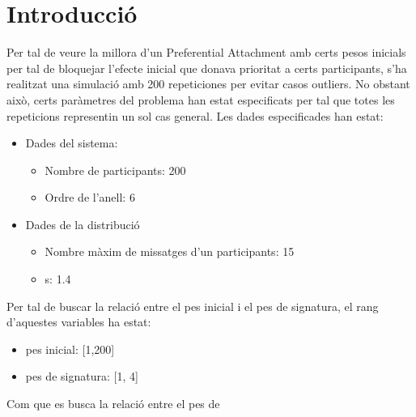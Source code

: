 \documentclass{article}
\begin{document}
\section{Introducció}
Per tal de veure la millora d'un Preferential Attachment amb certs pesos inicials per tal de bloquejar l'efecte inicial que donava prioritat a certs participants, s'ha realitzat una simulació amb 200 repeticiones per evitar casos outliers. No obstant això, certs paràmetres del problema han estat especificats per tal que totes les repeticions representin un sol cas general. Les dades especificades han estat:
\begin{itemize}
	\item Dades del sistema:
	\begin{itemize}	
		\item Nombre de participants: 200
		\item Ordre de l'anell: 6
	\end{itemize}
	\item Dades de la distribució
	\begin{itemize}
		\item Nombre màxim de missatges d'un participants: 15
		\item s: 1.4
	\end{itemize}
\end{itemize}
Per tal de buscar la relació entre el pes inicial i el pes de signatura, el rang d'aquestes variables ha estat:
\begin{itemize}
	\item pes inicial: [1,200]
	\item pes de signatura: [1, 4]
\end{itemize}
Com que es busca la relació entre el pes de 
\end{document}
